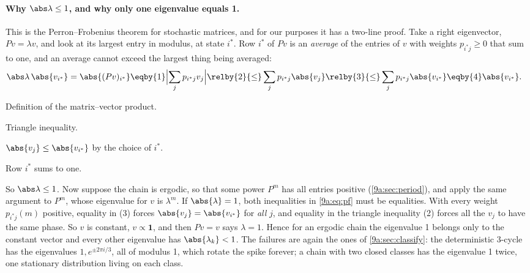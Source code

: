 \paragraph{Why $\abs\lambda\le1$, and why only one eigenvalue equals 1.}
This is the Perron--Frobenius theorem for stochastic matrices, and for our purposes it has a
two-line proof. Take a right eigenvector, $Pv=\lambda v$, and look at its largest entry in
modulus, at state $i^*$. Row $i^*$ of $Pv$ is an \emph{average} of the entries of $v$ with
weights $p_{i^*j}\ge0$ that sum to one, and an average cannot exceed the largest thing being
averaged:
\begin{align}
  \abs\lambda\,\abs{v_{i^*}}
  =\abs{(Pv)_{i^*}}
  &\eqby{1}\Bigl|\sum_jp_{i^*j}v_j\Bigr|
   \relby{2}{\le}\sum_jp_{i^*j}\abs{v_j}
   \relby{3}{\le}\sum_jp_{i^*j}\abs{v_{i^*}}
   \eqby{4}\abs{v_{i^*}} .
  \label{9a:eq:pf}
\end{align}
\begin{explain}
  \item Definition of the matrix--vector product.
  \item Triangle inequality.
  \item $\abs{v_j}\le\abs{v_{i^*}}$ by the choice of $i^*$.
  \item Row $i^*$ sums to one.
\end{explain}
So $\abs\lambda\le1$. Now suppose the chain is ergodic, so that some power $P^m$ has all entries
positive (\cref{9a:sec:period}), and apply the same argument to $P^m$, whose eigenvalue for $v$
is $\lambda^m$. If $\abs{\lambda}=1$, both inequalities in \eqref{9a:eq:pf} must be equalities.
With every weight $p_{i^*j}(m)$ positive, equality in (3) forces $\abs{v_j}=\abs{v_{i^*}}$ for
\emph{all} $j$, and equality in the triangle inequality (2) forces all the $v_j$ to have the same
phase. So $v$ is constant, $v\propto\mathbf1$, and then $Pv=v$ says $\lambda=1$. Hence for an ergodic chain the eigenvalue 1 belongs only to the constant vector and
every other eigenvalue has $\abs{\lambda_k}<1$. The failures are again the ones of
\cref{9a:sec:classify}: the deterministic 3-cycle has the eigenvalues $1,e^{\pm2\pi i/3}$, all of
modulus 1, which rotate the spike forever; a chain with two closed classes has the eigenvalue 1
twice, one stationary distribution living on each class.


